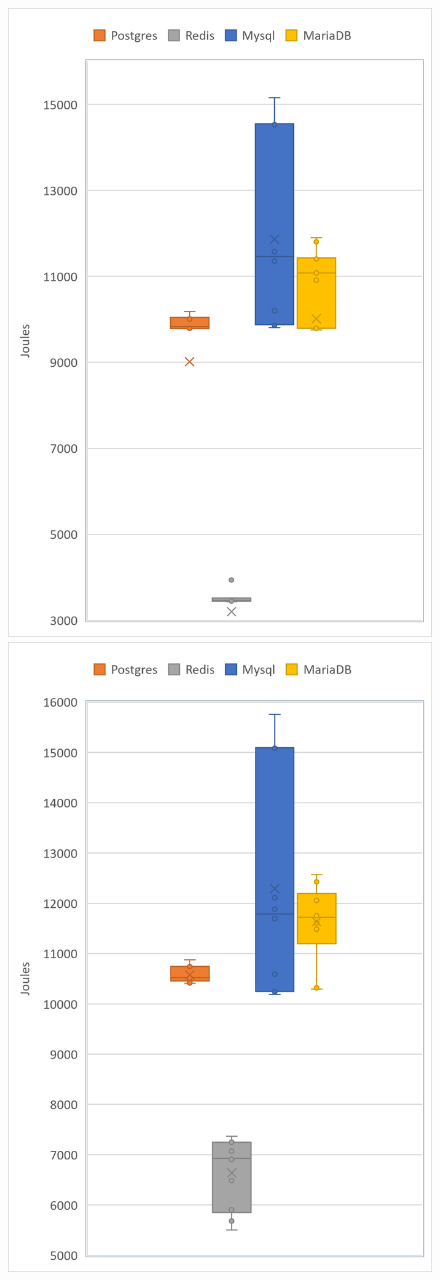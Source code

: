 \begin{figure}[h!]
\includegraphics[width=0.5\columnwidth]{results/boxplot/Disk.png}
\includegraphics[width=0.5\columnwidth]{results/boxplot/Total.png}
\label{fig:bocplotyenergy}	
\end{figure}
